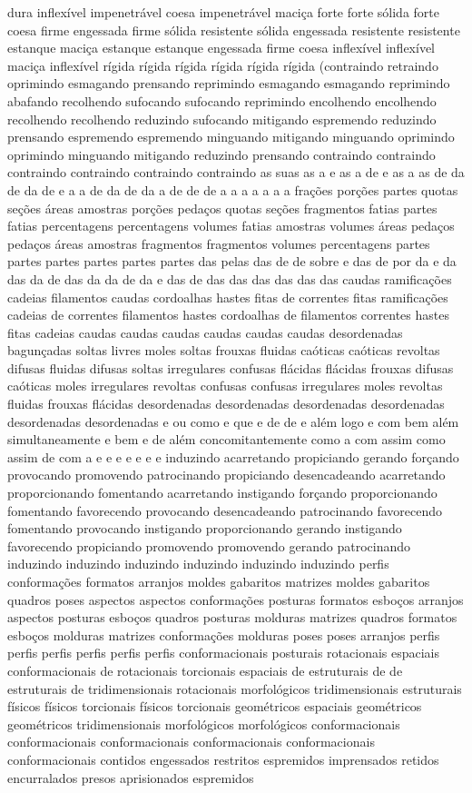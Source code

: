 dura inflexível impenetrável coesa impenetrável maciça forte forte sólida forte coesa firme engessada firme sólida resistente sólida engessada resistente resistente estanque maciça estanque estanque engessada firme coesa inflexível inflexível maciça inflexível rígida rígida rígida rígida rígida rígida (contraindo retraindo oprimindo esmagando prensando reprimindo esmagando esmagando reprimindo abafando recolhendo sufocando sufocando reprimindo encolhendo encolhendo recolhendo recolhendo reduzindo sufocando mitigando espremendo reduzindo prensando espremendo espremendo minguando mitigando minguando oprimindo oprimindo minguando mitigando reduzindo prensando contraindo contraindo contraindo contraindo contraindo contraindo as suas as a e as a de e as a as de da de da de e a a de da de da a de de de a a a a a a a frações porções partes quotas seções áreas amostras porções pedaços quotas seções fragmentos fatias partes fatias percentagens percentagens volumes fatias amostras volumes áreas pedaços pedaços áreas amostras fragmentos fragmentos volumes percentagens partes partes partes partes partes partes das pelas das de de sobre e das de por da e da das da de das da da de da e das de das das das das das das caudas ramificações cadeias filamentos caudas cordoalhas hastes fitas de correntes fitas ramificações cadeias de correntes filamentos hastes cordoalhas de filamentos correntes hastes fitas cadeias caudas caudas caudas caudas caudas caudas desordenadas bagunçadas soltas livres moles soltas frouxas fluidas caóticas caóticas revoltas difusas fluidas difusas soltas irregulares confusas flácidas flácidas frouxas difusas caóticas moles irregulares revoltas confusas confusas irregulares moles revoltas fluidas frouxas flácidas desordenadas desordenadas desordenadas desordenadas desordenadas desordenadas e ou como e que e de de e além logo e com bem além simultaneamente e bem e de além concomitantemente como a com assim como assim de com a e e e e e e e induzindo acarretando propiciando gerando forçando provocando promovendo patrocinando propiciando desencadeando acarretando proporcionando fomentando acarretando instigando forçando proporcionando fomentando favorecendo provocando desencadeando patrocinando favorecendo fomentando provocando instigando proporcionando gerando instigando favorecendo propiciando promovendo promovendo gerando patrocinando induzindo induzindo induzindo induzindo induzindo induzindo perfis conformações formatos arranjos moldes gabaritos matrizes moldes gabaritos quadros poses aspectos aspectos conformações posturas formatos esboços arranjos aspectos posturas esboços quadros posturas molduras matrizes quadros formatos esboços molduras matrizes conformações molduras poses poses arranjos perfis perfis perfis perfis perfis perfis conformacionais posturais rotacionais espaciais conformacionais de rotacionais torcionais espaciais de estruturais de de estruturais de tridimensionais rotacionais morfológicos tridimensionais estruturais físicos físicos torcionais físicos torcionais geométricos espaciais geométricos geométricos tridimensionais morfológicos morfológicos conformacionais conformacionais conformacionais conformacionais conformacionais conformacionais contidos engessados restritos espremidos imprensados retidos encurralados presos aprisionados espremidos 